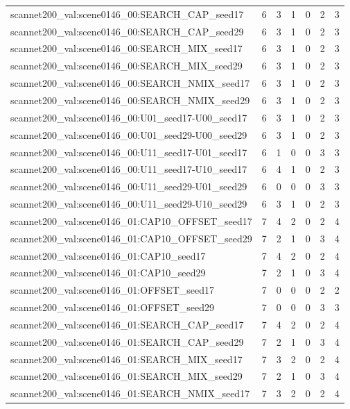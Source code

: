 \begin{table}[t]
\begin{tabular}{lrrrrrr}
scannet200\_val:scene0146\_00:SEARCH\_CAP\_seed17 & 6 & 3 & 1 & 0 & 2 & 3 \\
scannet200\_val:scene0146\_00:SEARCH\_CAP\_seed29 & 6 & 3 & 1 & 0 & 2 & 3 \\
scannet200\_val:scene0146\_00:SEARCH\_MIX\_seed17 & 6 & 3 & 1 & 0 & 2 & 3 \\
scannet200\_val:scene0146\_00:SEARCH\_MIX\_seed29 & 6 & 3 & 1 & 0 & 2 & 3 \\
scannet200\_val:scene0146\_00:SEARCH\_NMIX\_seed17 & 6 & 3 & 1 & 0 & 2 & 3 \\
scannet200\_val:scene0146\_00:SEARCH\_NMIX\_seed29 & 6 & 3 & 1 & 0 & 2 & 3 \\
scannet200\_val:scene0146\_00:U01\_seed17-U00\_seed17 & 6 & 3 & 1 & 0 & 2 & 3 \\
scannet200\_val:scene0146\_00:U01\_seed29-U00\_seed29 & 6 & 3 & 1 & 0 & 2 & 3 \\
scannet200\_val:scene0146\_00:U11\_seed17-U01\_seed17 & 6 & 1 & 0 & 0 & 3 & 3 \\
scannet200\_val:scene0146\_00:U11\_seed17-U10\_seed17 & 6 & 4 & 1 & 0 & 2 & 3 \\
scannet200\_val:scene0146\_00:U11\_seed29-U01\_seed29 & 6 & 0 & 0 & 0 & 3 & 3 \\
scannet200\_val:scene0146\_00:U11\_seed29-U10\_seed29 & 6 & 3 & 1 & 0 & 2 & 3 \\
scannet200\_val:scene0146\_01:CAP10\_OFFSET\_seed17 & 7 & 4 & 2 & 0 & 2 & 4 \\
scannet200\_val:scene0146\_01:CAP10\_OFFSET\_seed29 & 7 & 2 & 1 & 0 & 3 & 4 \\
scannet200\_val:scene0146\_01:CAP10\_seed17 & 7 & 4 & 2 & 0 & 2 & 4 \\
scannet200\_val:scene0146\_01:CAP10\_seed29 & 7 & 2 & 1 & 0 & 3 & 4 \\
scannet200\_val:scene0146\_01:OFFSET\_seed17 & 7 & 0 & 0 & 0 & 2 & 2 \\
scannet200\_val:scene0146\_01:OFFSET\_seed29 & 7 & 0 & 0 & 0 & 3 & 3 \\
scannet200\_val:scene0146\_01:SEARCH\_CAP\_seed17 & 7 & 4 & 2 & 0 & 2 & 4 \\
scannet200\_val:scene0146\_01:SEARCH\_CAP\_seed29 & 7 & 2 & 1 & 0 & 3 & 4 \\
scannet200\_val:scene0146\_01:SEARCH\_MIX\_seed17 & 7 & 3 & 2 & 0 & 2 & 4 \\
scannet200\_val:scene0146\_01:SEARCH\_MIX\_seed29 & 7 & 2 & 1 & 0 & 3 & 4 \\
scannet200\_val:scene0146\_01:SEARCH\_NMIX\_seed17 & 7 & 3 & 2 & 0 & 2 & 4 \\

\end{tabular}
\end{table}
